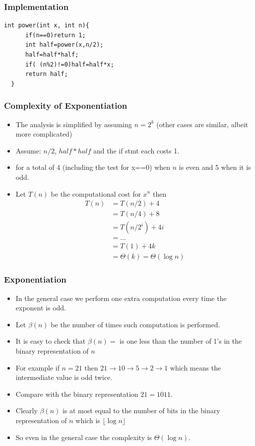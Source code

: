 \documentclass{beamer}
\begin{document}
\begin{frame}[fragile]
  \frametitle{Implementation}
 \begin{lstlisting}[frame=none,numbers=none]
int power(int x, int n){
      if(n==0)return 1;
      int half=power(x,n/2);
      half=half*half;
      if( (n%2)!=0)half=half*x;
      return half;
  }
  \end{lstlisting}
\end{frame}



\begin{frame}
  \frametitle{Complexity of Exponentiation}
  \begin{itemize}
  \item The analysis is simplified by assuming $n=2^k$ (other cases
    are similar, albeit more complicated)
  \item Assume: $n/2$, $half*half$ and the if stmt each costs 1.
  \item for a total of 4 (including the test for x==0) when $n$ is even and 5 when it is odd.
\item Let $T(n)$ be the computational cost for $x^n$ then
  \begin{align*}
 T(n) &=T(n/2)+4\\
      &=T(n/4)+8\\
      &=T(n/2^i)+4i\\
      &=\ldots\\
      &=T(1)+4k\\
      &=\Theta(k)=\Theta(\log n)
  \end{align*}

  \end{itemize}
\end{frame}
\begin{frame}
  \frametitle{Exponentiation}
  \begin{itemize}
  \item In the general case we perform one extra computation every time the exponent is odd.
  \item Let $\beta(n)$ be the number of times such computation is performed.
  \item It is easy to check that $\beta(n)=$ is one less than the number of 1's in the binary representation of $n$
  \item For example if $n=21$ then $21\rightarrow 10\rightarrow 5\rightarrow 2\rightarrow 1$ which means the intermediate value is odd twice.
  \item Compare with the binary representation $21=1011$.
  \item Clearly $\beta(n)$ is at most equal to the number of bits in the binary representation of $n$ which is $\lfloor\log n\rfloor$
\item So even in the general case the complexity is $\Theta(\log n)$.
  \end{itemize}
\end{frame}
\end{document}
